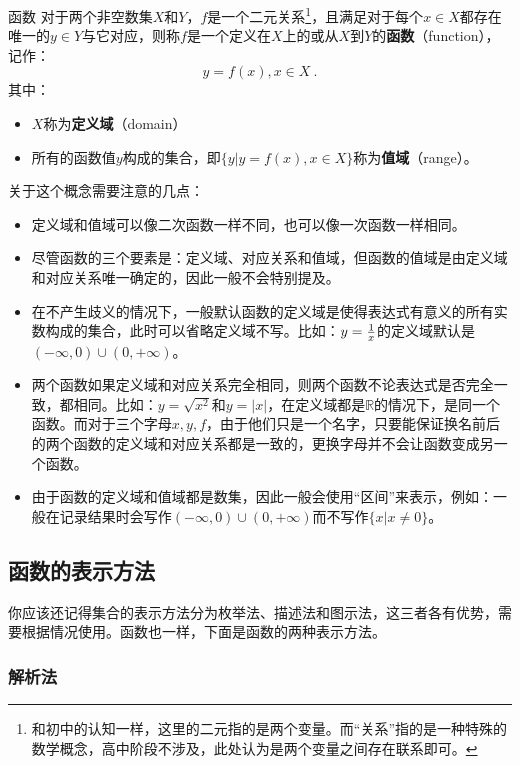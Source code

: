 \begin{definition}{函数}\label{def_functi_1}
对于两个非空数集$X$和$Y$，$f$是一个二元关系\footnote{和初中的认知一样，这里的二元指的是两个变量。而“关系”指的是一种特殊的数学概念，高中阶段不涉及，此处认为是两个变量之间存在联系即可。}，且满足对于每个$x\in X$都存在唯一的$y\in Y$与它对应，则称$f$是一个定义在$X$上的或从$X$到$Y$的\textbf{函数}（function），记作：
\begin{equation}
y=f(x),x\in X~.
\end{equation}
其中：
\begin{itemize}
\item $X$称为\textbf{定义域}（domain）
\item 所有的函数值$y$构成的集合，即$\{y|y=f(x),x\in X\}$称为\textbf{值域}（range）。
\end{itemize}
\end{definition}

关于这个概念需要注意的几点：
\begin{itemize}
\item 定义域和值域可以像二次函数一样不同，也可以像一次函数一样相同。
\item 尽管函数的三个要素是：定义域、对应关系和值域，但函数的值域是由定义域和对应关系唯一确定的，因此一般不会特别提及。
\item 在不产生歧义的情况下，一般默认函数的定义域是使得表达式有意义的所有实数构成的集合，此时可以省略定义域不写。比如：$y={1\over x}$的定义域默认是$(-\infty,0)\cup(0,+\infty)$。
\item 两个函数如果定义域和对应关系完全相同，则两个函数不论表达式是否完全一致，都相同。比如：$y=\sqrt{x^2}$和$y=|x|$，在定义域都是$\mathbb R$的情况下，是同一个函数。而对于三个字母$x,y,f$，由于他们只是一个名字，只要能保证换名前后的两个函数的定义域和对应关系都是一致的，更换字母并不会让函数变成另一个函数。
\item 由于函数的定义域和值域都是数集，因此一般会使用“区间”来表示，例如：一般在记录结果时会写作$(-\infty,0)\cup(0,+\infty)$而不写作$\{x|x\neq0\}$。
\end{itemize}

\subsection{函数的表示方法}

你应该还记得集合的表示方法分为枚举法、描述法和图示法，这三者各有优势，需要根据情况使用。函数也一样，下面是函数的两种表示方法。

\subsubsection{解析法}

